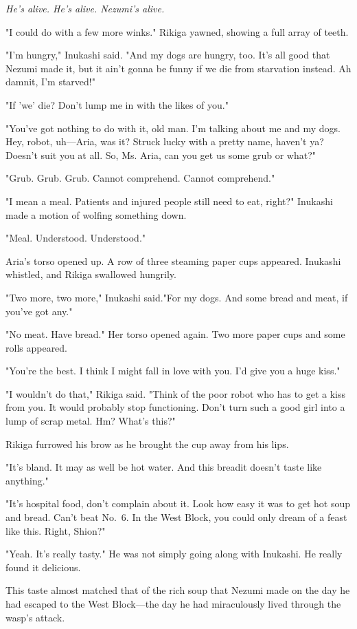 \emph{He's alive. He's alive. Nezumi's alive.}

"I could do with a few more winks." Rikiga yawned, showing a full array
of teeth.

"I'm hungry," Inukashi said. "And my dogs are hungry, too. It's all good
that Nezumi made it, but it ain't gonna be funny if we die from
starvation instead. Ah damnit, I'm starved!"

"If 'we' die? Don't lump me in with the likes of you."

"You've got nothing to do with it, old man. I'm talking about me and my
dogs. Hey, robot, uh---Aria, was it? Struck lucky with a pretty name,
haven't ya? Doesn't suit you at all. So, Ms. Aria, can you get us some
grub or what?"

{\sffamily "Grub. Grub. Grub. Cannot comprehend. Cannot comprehend."}

"I mean a meal. Patients and injured people still need to eat, right?"
Inukashi made a motion of wolfing something down.

{\sffamily "Meal. Understood. Understood."}

Aria's torso opened up. A row of three steaming paper cups appeared.
Inukashi whistled, and Rikiga swallowed hungrily.

"Two more, two more," Inukashi said."For my dogs. And some bread and
meat, if you've got any."

{\sffamily "No meat. Have bread."} Her torso opened again. Two more paper cups and
some rolls appeared.

"You're the best. I think I might fall in love with you. I'd give you a
huge kiss."

"I wouldn't do that," Rikiga said. "Think of the poor robot who has to
get a kiss from you. It would probably stop functioning. Don't turn such
a good girl into a lump of scrap metal. Hm? What's this?"

Rikiga furrowed his brow as he brought the cup away from his lips.

"It's bland. It may as well be hot water. And this bread\el it doesn't
taste like anything."

"It's hospital food, don't complain about it. Look how easy it was to
get hot soup and bread. Can't beat No.~6. In the West Block, you could
only dream of a feast like this. Right, Shion?"

"Yeah. It's really tasty." He was not simply going along with Inukashi.
He really found it delicious.

This taste almost matched that of the rich soup that Nezumi made on the
day he had escaped to the West Block---the day he had miraculously lived
through the wasp's attack.

